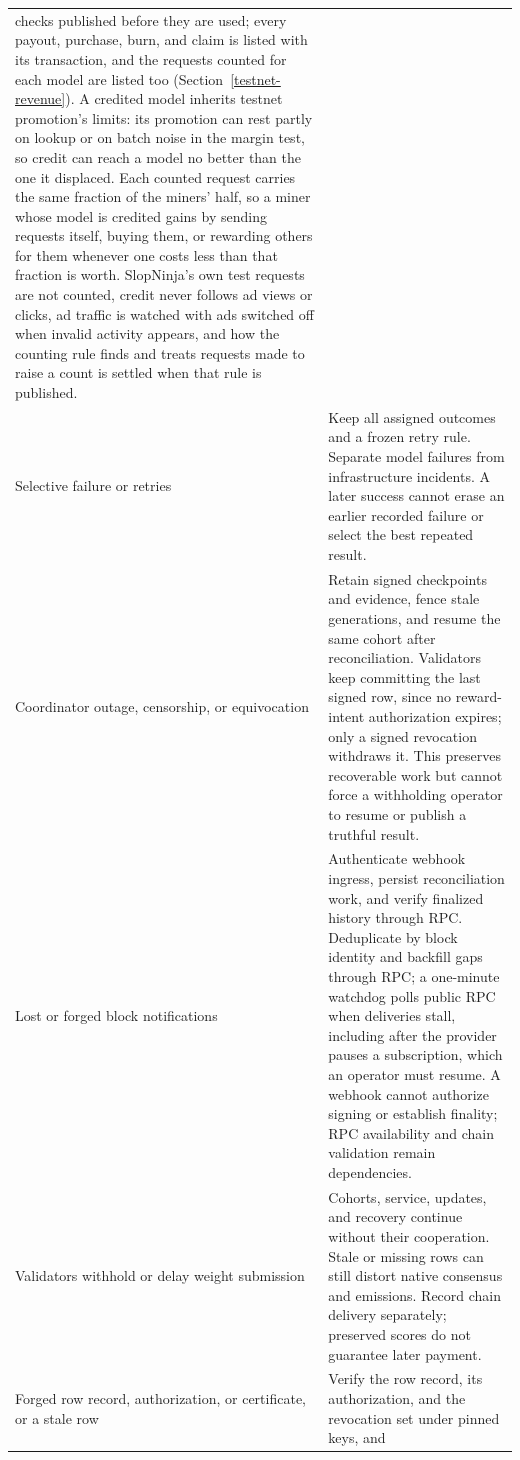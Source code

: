 \begin{longtable}{@{}>{\raggedright\arraybackslash}p{}>{\raggedright\arraybackslash}p{}@{}}
checks published before they are used; every payout, purchase, burn, and
claim is listed with its transaction, and the requests counted for each model
are listed too (Section~\ref{testnet-revenue}). A credited model inherits
testnet promotion's limits: its promotion can rest partly on lookup or on
batch noise in the margin test, so credit can reach a model no better than the
one it displaced. Each counted request carries the same fraction of the miners'
half, so a miner whose model is credited gains by sending requests itself,
buying them, or rewarding others for them whenever one costs less than that
fraction is worth. SlopNinja's own test requests are not counted, credit never
follows ad views or clicks, ad traffic is watched with ads switched off when
invalid activity appears, and how the counting rule finds and treats requests
made to raise a count is settled when that rule is published. \\
Selective failure or retries & Keep all assigned outcomes and a frozen retry
rule. Separate model failures from infrastructure incidents. A later success
cannot erase an earlier recorded failure or select the best repeated result. \\
Coordinator outage, censorship, or equivocation & Retain signed checkpoints and
evidence, fence stale generations, and resume the same cohort after reconciliation.
Validators keep committing the last signed row, since no reward-intent
authorization expires;
only a signed revocation withdraws it. This preserves recoverable work but
cannot force a withholding operator to resume or publish a truthful result. \\
Lost or forged block notifications & Authenticate webhook ingress, persist
reconciliation work, and verify finalized history through RPC. Deduplicate by
block identity and backfill gaps through RPC; a one-minute watchdog polls
public RPC when deliveries stall, including after the provider pauses a
subscription, which an operator must resume. A webhook
cannot authorize signing or establish finality; RPC availability and chain
validation remain dependencies. \\
Validators withhold or delay weight submission & Cohorts, service, updates, and
recovery continue without their cooperation. Stale or missing rows can still
distort native consensus and emissions. Record chain delivery separately;
preserved scores do not guarantee later payment. \\
Forged row record, authorization, or certificate, or a stale row & Verify the
row record, its authorization, and the revocation set under pinned keys, and

\end{longtable}
